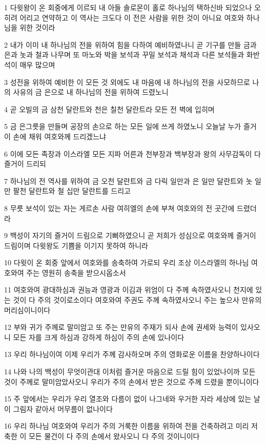\par 1 다윗왕이 온 회중에게 이르되 내 아들 솔로몬이 홀로 하나님의 택하신바 되었으나 오히려 어리고 연약하고 이 역사는 크도다 이 전은 사람을 위한 것이 아니요 여호와 하나님을 위한 것이라
\par 2 내가 이미 내 하나님의 전을 위하여 힘을 다하여 예비하였나니 곧 기구를 만들 금과 은과 놋과 철과 나무며 또 마노와 박을 보석과 꾸밀 보석과 채석과 다른 보석들과 화반석이 매우 많으며
\par 3 성전을 위하여 예비한 이 모든 것 외에도 내 마음에 내 하나님의 전을 사모하므로 나의 사유의 금 은으로 내 하나님의 전을 위하여 드렸노니
\par 4 곧 오빌의 금 삼천 달란트와 천은 칠천 달란트라 모든 전 벽에 입히며
\par 5 금 은그릇을 만들며 공장의 손으로 하는 모든 일에 쓰게 하였노니 오늘날 누가 즐거이 손에 채워 여호와께 드리겠느냐
\par 6 이에 모든 족장과 이스라엘 모든 지파 어른과 천부장과 백부장과 왕의 사무감독이 다 즐거이 드리되
\par 7 하나님의 전 역사를 위하여 금 오천 달란트와 금 다릭 일만과 은 일만 달란트와 놋 일만 팔천 달란트와 철 십만 달란트를 드리고
\par 8 무릇 보석이 있는 자는 게르손 사람 여히엘의 손에 부쳐 여호와의 전 곳간에 드렸더라
\par 9 백성이 자기의 즐거이 드림으로 기뻐하였으니 곧 저희가 성심으로 여호와께 즐거이 드림이며 다윗왕도 기쁨을 이기지 못하여 하니라
\par 10 다윗이 온 회중 앞에서 여호와를 송축하여 가로되 우리 조상 이스라엘의 하나님 여호와여 주는 영원히 송축을 받으시옵소서
\par 11 여호와여 광대하심과 권능과 영광과 이김과 위엄이 다 주께 속하였사오니 천지에 있는 것이 다 주의 것이로소이다 여호와여 주권도 주께 속하였사오니 주는 높으사 만유의 머리심이니이다
\par 12 부와 귀가 주께로 말미암고 또 주는 만유의 주재가 되사 손에 권세와 능력이 있사오니 모든 자를 크게 하심과 강하게 하심이 주의 손에 있나이다
\par 13 우리 하나님이여 이제 우리가 주께 감사하오며 주의 영화로운 이름을 찬양하나이다
\par 14 나와 나의 백성이 무엇이관대 이처럼 즐거운 마음으로 드릴 힘이 있었나이까 모든 것이 주께로 말미암았사오니 우리가 주의 손에서 받은 것으로 주께 드렸을 뿐이니이다
\par 15 주 앞에서는 우리가 우리 열조와 다름이 없이 나그네와 우거한 자라 세상에 있는 날이 그림자 같아서 머무름이 없나이다
\par 16 우리 하나님 여호와여 우리가 주의 거룩한 이름을 위하여 전을 건축하려고 미리 저축한 이 모든 물건이 다 주의 손에서 왔사오니 다 주의 것이니이다

